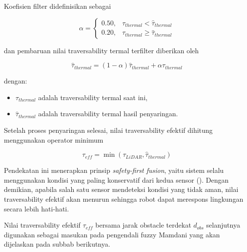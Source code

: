 Koefisien filter didefinisikan sebagai

\begin{equation}
\alpha=
\begin{cases}
0.50, & \tau_{thermal}<\hat{\tau}_{thermal}\\
0.20, & \tau_{thermal}\geq\hat{\tau}_{thermal}
\end{cases}
\label{eq:lpf_alpha}
\end{equation}

dan pembaruan nilai traversability termal terfilter diberikan oleh

\begin{equation}
\hat{\tau}_{thermal}
=
(1-\alpha)\hat{\tau}_{thermal}
+
\alpha\tau_{thermal}
\label{eq:lpf_update}
\end{equation}

dengan:

\begin{itemize}
\item $\tau_{thermal}$ adalah traversability termal saat ini,
\item $\hat{\tau}_{thermal}$ adalah traversability termal hasil penyaringan.
\end{itemize}

Setelah proses penyaringan selesai, nilai traversability efektif dihitung menggunakan operator minimum

\begin{equation}
\tau_{eff}
=
\min
\left(
\tau_{LiDAR},
\hat{\tau}_{thermal}
\right)
\label{eq:trav_eff}
\end{equation}

Pendekatan ini menerapkan prinsip \textit{safety-first fusion}, yaitu sistem selalu menggunakan kondisi yang paling konservatif dari kedua sensor (\cite{Haider2022,Schichler2025}). Dengan demikian, apabila salah satu sensor mendeteksi kondisi yang tidak aman, nilai traversa\-bility efektif akan menurun sehingga robot dapat merespons lingkungan secara lebih hati-hati.

Nilai traversability efektif $\tau_{eff}$ bersama jarak obstacle terdekat $d_{obs}$ selanjutnya digunakan sebagai masukan pada pengendali fuzzy Mamdani yang akan dijelaskan pada subbab berikutnya.